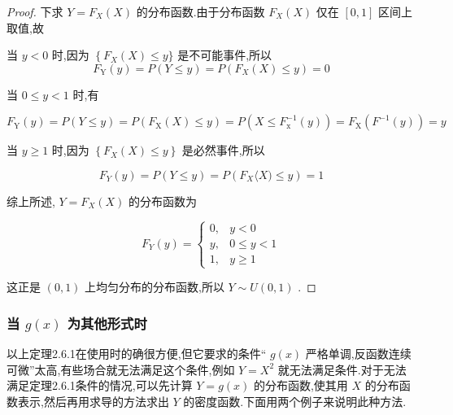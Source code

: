 \begin{proof}
	下求 $ Y=F_{X}(X) $ 的分布函数.由于分布函数 $ F_{X}(X) $ 仅在 $ [0,1] $ 区间上取值,故
	
	当 $ y<0 $ 时,因为 $ \left\{F_{X}(X) \leqslant y\right.\} $ 是不可能事件,所以 \[
	F_{\mathrm{Y}}(y)=P(Y \leqslant y)=P\left(F_{X}(X) \leqslant y\right)=0
	\]
	
	当 $ 0 \leqslant y<1 $ 时,有
	
	\[
	F_{\mathrm{Y}}(y)=P(Y \leqslant y)=P\left(F_{\mathrm{X}}(X) \leqslant y\right)=P\left(X \leqslant F_{\mathrm{x}}^{-1}(y)\right)=F_{\mathrm{X}}\left(F^{-1}(y)\right)=y
	\]
	
	当 $ y \geqslant 1 $ 时,因为 $ \left\{F_{X}(X) \leqslant y\right\} $ 是必然事件,所以
	
	\[
	F_{Y}(y)=P(Y \leqslant y)=P\left(F_{X}\langle X) \leqslant y\right)=1
	\]
	
	综上所述, $ Y=F_{X}(X) $ 的分布函数为
	
	\[
	F_{Y}(y)=\left\{\begin{array}{ll}{0,} & {y<0} \\ {y,} & {0 \leqslant y<1} \\ {1,} & {y \geqslant 1}\end{array}\right.
	\]
	
	这正是 $ (0,1) $ 上均匀分布的分布函数,所以 $ Y \sim U(0,1) $ .
\end{proof}

\subsubsection{当 $ g(x) $ 为其他形式时}

以上定理2.6.1在使用时的确很方便,但它要求的条件“ $ g(x) $ 严格单调,反函数连续可微”太高,有些场合就无法满足这个条件,例如 $ Y=X^{2} $ 就无法满足条件.对于无法满足定理2.6.1条件的情况,可以先计算 $ Y=g(x) $ 的分布函数,使其用 $ X $ 的分布函数表示,然后再用求导的方法求出 $ Y $ 的密度函数.下面用两个例子来说明此种方法.

